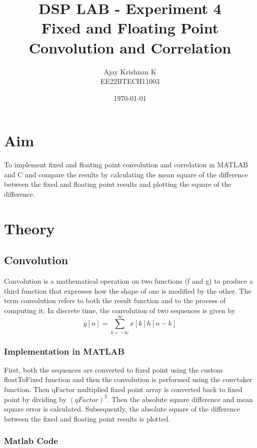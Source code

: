 \documentclass[a4paper,12pt]{article}
\title{\textbf{DSP LAB - Experiment 4} \\
    \large{Fixed and Floating Point Convolution and Correlation}}
\author{Ajay Krishnan K \\  EE22BTECH11003}
\date{\today}
\begin{document}
\maketitle

\tableofcontents

\newpage

\section{Aim}
To implement fixed and floating point convolution and correlation in MATLAB and C and compare the results
by calculating the mean square of the difference between the fixed and floating point results and
 plotting the square of the difference.

\section{Theory}
\subsection{Convolution}
Convolution is a mathematical operation on two functions (f and g) to produce a 
third function that expresses how the shape of one is modified by the other. 
The term convolution refers to both the result function and to the process of computing it.
 In discrete time, the convolution of two sequences is given by
\[
    y[n] = \sum_{k=-\infty}^{\infty} x[k]h[n-k]
\]

\subsubsection{Implementation in MATLAB}
First, both the sequences are converted to fixed point using the custom floatToFixed function 
and then the convolution is performed using the convtaker function. Then qFactor multiplied fixed point array
is converted back to fixed point by dividing by ${(qFactor)}^2$. Then the absolute square difference and mean square error is calculated.
Subsequently, the absolute square of the difference between the fixed and floating point results is plotted.

\subsubsection{Matlab Code}

\end{document}
